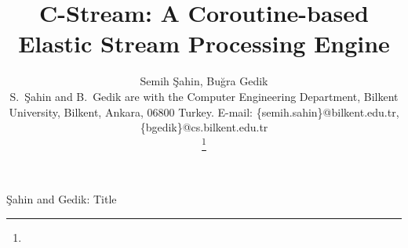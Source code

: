 



  \title{C-Stream: A Coroutine-based Elastic Stream Processing Engine}

  \author
  {
    Semih \c{S}ahin,
    Bu\u{g}ra Gedik
    \IEEEcompsocitemizethanks
    {

      \IEEEcompsocthanksitem S.\ \c{S}ahin and B.\ Gedik
             are with the
             Computer Engineering Department, Bilkent
             University, Bilkent, Ankara, 06800 Turkey. E-mail:
             \{semih.sahin\}@bilkent.edu.tr, \{bgedik\}@cs.bilkent.edu.tr
    }%
    \thanks{}
  }

           {\c{Sahin} and Gedik: Title}
  \IEEEcompsoctitleabstractindextext{}
  \maketitle

  \IEEEpeerreviewmaketitle

  
  
  

  
  


